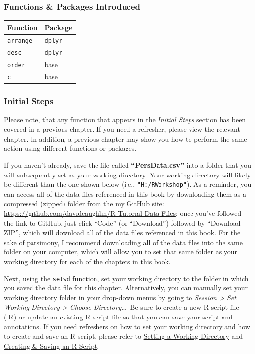\documentclass[]{book}
\begin{document}
\subsubsection{Functions \& Packages
Introduced}\label{functions-packages-introduced}

\begin{longtable}[]{@{}ll@{}}
\toprule
Function & Package\tabularnewline
\midrule
\endhead
\texttt{arrange} & \texttt{dplyr}\tabularnewline
\texttt{desc} & \texttt{dplyr}\tabularnewline
\texttt{order} & base\tabularnewline
\texttt{c} & base\tabularnewline
\bottomrule
\end{longtable}

\hypertarget{initsteps_arrange}{\subsubsection{Initial
Steps}\label{initsteps_arrange}}

Please note, that any function that appears in the \emph{Initial Steps}
section has been covered in a previous chapter. If you need a refresher,
please view the relevant chapter. In addition, a previous chapter may
show you how to perform the same action using different functions or
packages.

If you haven't already, save the file called \textbf{``PersData.csv''}
into a folder that you will subsequently set as your working directory.
Your working directory will likely be different than the one shown below
(i.e., \texttt{"H:/RWorkshop"}). As a reminder, you can access all of
the data files referenced in this book by downloading them as a
compressed (zipped) folder from the my GitHub site:
\url{https://github.com/davidcaughlin/R-Tutorial-Data-Files}; once
you've followed the link to GitHub, just click ``Code'' (or
``Download'') followed by ``Download ZIP'', which will download all of
the data files referenced in this book. For the sake of parsimony, I
recommend downloading all of the data files into the same folder on your
computer, which will allow you to set that same folder as your working
directory for each of the chapters in this book.

Next, using the \texttt{setwd} function, set your working directory to
the folder in which you saved the data file for this chapter.
Alternatively, you can manually set your working directory folder in
your drop-down menus by going to \emph{Session \textgreater{} Set
Working Directory \textgreater{} Choose Directory\ldots{}}. Be sure to
create a new R script file (.R) or update an existing R script file so
that you can save your script and annotations. If you need refreshers on
how to set your working directory and how to create and save an R
script, please refer to \protect\hyperlink{setwd}{Setting a Working
Directory} and \protect\hyperlink{createRscript}{Creating \& Saving an R
Script}.
\end{document}
